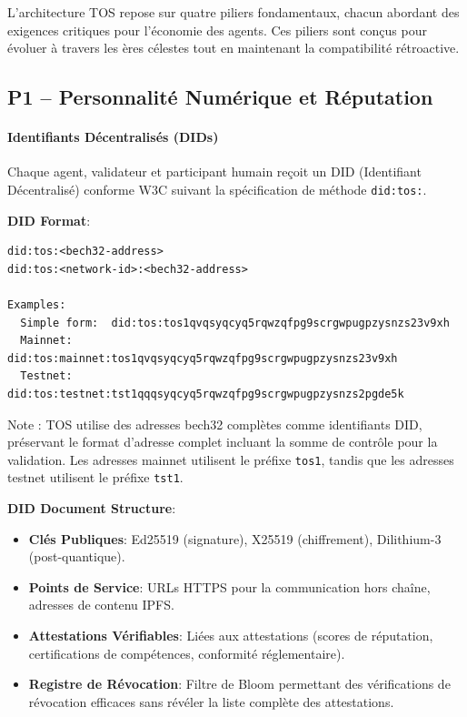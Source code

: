 \documentclass[11pt]{article}
\begin{document}
L'architecture TOS repose sur quatre piliers fondamentaux, chacun abordant des exigences critiques pour l'économie des agents. Ces piliers sont conçus pour évoluer à travers les ères célestes tout en maintenant la compatibilité rétroactive.

\subsection{P1 -- Personnalité Numérique et Réputation}
\label{sec:pillar-identity}

\paragraph{Identifiants Décentralisés (DIDs)}
Chaque agent, validateur et participant humain reçoit un DID (Identifiant Décentralisé) conforme W3C suivant la spécification de méthode \texttt{did:tos:}.

\textbf{DID Format}:
\begin{verbatim}
did:tos:<bech32-address>
did:tos:<network-id>:<bech32-address>

Examples:
  Simple form:  did:tos:tos1qvqsyqcyq5rqwzqfpg9scrgwpugpzysnzs23v9xh
  Mainnet:      did:tos:mainnet:tos1qvqsyqcyq5rqwzqfpg9scrgwpugpzysnzs23v9xh
  Testnet:      did:tos:testnet:tst1qqqsyqcyq5rqwzqfpg9scrgwpugpzysnzs2pgde5k
\end{verbatim}
Note : TOS utilise des adresses bech32 complètes comme identifiants DID, préservant le format d'adresse complet incluant la somme de contrôle pour la validation. Les adresses mainnet utilisent le préfixe \texttt{tos1}, tandis que les adresses testnet utilisent le préfixe \texttt{tst1}.

\textbf{DID Document Structure}:
\begin{itemize}[noitemsep]
  \item \textbf{Clés Publiques}: Ed25519 (signature), X25519 (chiffrement), Dilithium-3 (post-quantique).
  \item \textbf{Points de Service}: URLs HTTPS pour la communication hors chaîne, adresses de contenu IPFS.
  \item \textbf{Attestations Vérifiables}: Liées aux attestations (scores de réputation, certifications de compétences, conformité réglementaire).
  \item \textbf{Registre de Révocation}: Filtre de Bloom permettant des vérifications de révocation efficaces sans révéler la liste complète des attestations.
\end{itemize}
\end{document}
